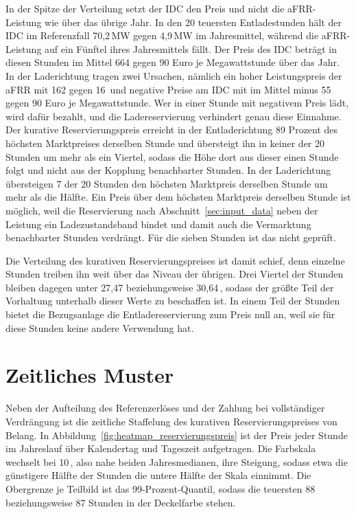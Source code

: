 In der Spitze der Verteilung setzt der \ac{IDC} den Preis und nicht die \ac{aFRR}-Leistung wie über das übrige Jahr.
In den 20 teuersten Entladestunden hält der \ac{IDC} im Referenzfall 70,2\,\si{MW} gegen 4,9\,\si{MW} im Jahresmittel, während die \ac{aFRR}-Leistung auf ein Fünftel ihres Jahresmittels fällt.
Der Preis des \ac{IDC} beträgt in diesen Stunden im Mittel 664 gegen 90 Euro je Megawattstunde über das Jahr.
In der Laderichtung tragen zwei Ursachen, nämlich ein hoher Leistungspreis der \ac{aFRR} mit 162 gegen 16\,\EurMWh{} und negative Preise am \ac{IDC} mit im Mittel minus 55 gegen 90 Euro je Megawattstunde.
Wer in einer Stunde mit negativem Preis lädt, wird dafür bezahlt, und die Ladereservierung verhindert genau diese Einnahme.
Der kurative Reservierungspreis erreicht in der Entladerichtung 89 Prozent des höchsten Marktpreises derselben Stunde und übersteigt ihn in keiner der 20 Stunden um mehr als ein Viertel, sodass die Höhe dort aus dieser einen Stunde folgt und nicht aus der Kopplung benachbarter Stunden.
In der Laderichtung übersteigen 7 der 20 Stunden den höchsten Marktpreis derselben Stunde um mehr als die Hälfte.
Ein Preis über dem höchsten Marktpreis derselben Stunde ist möglich, weil die Reservierung nach Abschnitt~\ref{sec:input_data} neben der Leistung ein Ladezustandsband bindet und damit auch die Vermarktung benachbarter Stunden verdrängt.
Für die sieben Stunden ist das nicht geprüft.

Die Verteilung des kurativen Reservierungspreises ist damit schief, denn einzelne Stunden treiben ihn weit über das Niveau der übrigen.
Drei Viertel der Stunden bleiben dagegen unter 27,47 beziehungsweise 30,64\,\EurMWh{}, sodass der größte Teil der Vorhaltung unterhalb dieser Werte zu beschaffen ist.
In einem Teil der Stunden bietet die Bezugsanlage die Entladereservierung zum Preis null an, weil sie für diese Stunden keine andere Verwendung hat.

\section{Zeitliches Muster}
\label{sec:price_pattern}

Neben der Aufteilung des Referenzerlöses und der Zahlung bei vollständiger Verdrängung ist die zeitliche Staffelung des kurativen Reservierungspreises von Belang.
In Abbildung~\ref{fig:heatmap_reservierungspreis} ist der Preis jeder Stunde im Jahreslauf über Kalendertag und Tageszeit aufgetragen.
Die Farbskala wechselt bei 10\,\EurMWh{}, also nahe beiden Jahresmedianen, ihre Steigung, sodass etwa die günstigere Hälfte der Stunden die untere Hälfte der Skala einnimmt.
Die Obergrenze je Teilbild ist das 99-Prozent-Quantil, sodass die teuersten 88 beziehungsweise 87 Stunden in der Deckelfarbe stehen.

